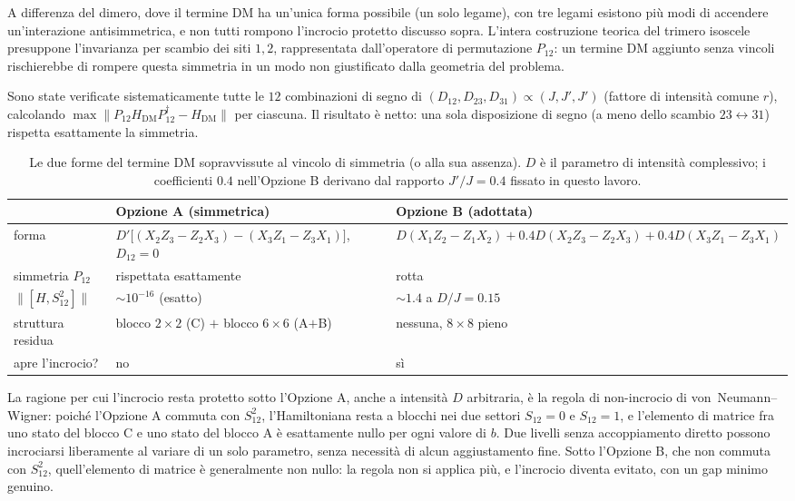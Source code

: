\documentclass[11pt,a4paper]{article}
\begin{document}
A differenza del dimero, dove il termine DM ha un'unica forma possibile
(un solo legame), con tre legami esistono più modi di accendere
un'interazione antisimmetrica, e non tutti rompono l'incrocio protetto
discusso sopra. L'intera costruzione teorica del trimero isoscele
presuppone l'invarianza per scambio dei siti $1,2$, rappresentata
dall'operatore di permutazione $P_{12}$: un termine DM aggiunto senza
vincoli rischierebbe di rompere questa simmetria in un modo non
giustificato dalla geometria del problema.

Sono state verificate sistematicamente tutte le $12$ combinazioni di
segno di $(D_{12},D_{23},D_{31})\propto(J,J',J')$ (fattore di intensità
comune $r$), calcolando $\max\lVert P_{12}H_\text{DM}P_{12}^\dagger -
H_\text{DM}\rVert$ per ciascuna. Il risultato è netto: una sola
disposizione di segno (a meno dello scambio $23\leftrightarrow31$)
rispetta esattamente la simmetria.

\begin{table}[htbp]
\centering
\renewcommand{\arraystretch}{1.4}
\begin{tabular}{@{}p{2.3cm}p{6.3cm}p{6.3cm}@{}}
\toprule
\rowcolor{grigetto}
& \textbf{Opzione A} (simmetrica) & \textbf{Opzione B} (adottata) \\
\midrule
forma & $D'\big[(X_2Z_3{-}Z_2X_3)-(X_3Z_1{-}Z_3X_1)\big]$, $D_{12}=0$ &
$D(X_1Z_2{-}Z_1X_2)+0.4D(X_2Z_3{-}Z_2X_3)+0.4D(X_3Z_1{-}Z_3X_1)$ \\
simmetria $P_{12}$ & rispettata esattamente & rotta \\
$\lVert[H,S_{12}^2]\rVert$ & $\sim10^{-16}$ (esatto) & $\sim1.4$ a
$D/J{=}0.15$ \\
struttura residua & blocco $2{\times}2$ (C) $+$ blocco $6{\times}6$
(A$+$B) & nessuna, $8\times8$ pieno \\
apre l'incrocio? & no & sì \\
\bottomrule
\end{tabular}
\caption{Le due forme del termine DM sopravvissute al vincolo di
simmetria (o alla sua assenza). $D$ è il parametro di intensità
complessivo; i coefficienti $0.4$ nell'Opzione B derivano dal rapporto
$J'/J=0.4$ fissato in questo lavoro.}
\label{tab:dm-opzioni}
\end{table}
\FloatBarrier

La ragione per cui l'incrocio resta protetto sotto l'Opzione A, anche a
intensità $D$ arbitraria, è la regola di non-incrocio di
von~Neumann--Wigner: poiché l'Opzione A commuta con $S_{12}^2$,
l'Hamiltoniana resta a blocchi nei due settori $S_{12}=0$ e $S_{12}=1$, e
l'elemento di matrice fra uno stato del blocco C e uno stato del blocco A
è esattamente nullo per ogni valore di $b$. Due livelli senza
accoppiamento diretto possono incrociarsi liberamente al variare di un
solo parametro, senza necessità di alcun aggiustamento fine. Sotto
l'Opzione B, che non commuta con $S_{12}^2$, quell'elemento di matrice è
generalmente non nullo: la regola non si applica più, e l'incrocio
diventa evitato, con un gap minimo genuino.
\end{document}
